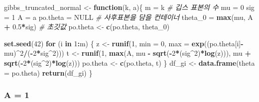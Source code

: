 \documentclass[
]{article}
\newenvironment{Shaded}{\begin{snugshade}}{\end{snugshade}}
\newcommand{\AttributeTok}[1]{\textcolor[rgb]{0.13,0.29,0.53}{#1}}
\newcommand{\CommentTok}[1]{\textcolor[rgb]{0.56,0.35,0.01}{\textit{#1}}}
\newcommand{\ConstantTok}[1]{\textcolor[rgb]{0.56,0.35,0.01}{#1}}
\newcommand{\ControlFlowTok}[1]{\textcolor[rgb]{0.13,0.29,0.53}{\textbf{#1}}}
\newcommand{\DecValTok}[1]{\textcolor[rgb]{0.00,0.00,0.81}{#1}}
\newcommand{\FloatTok}[1]{\textcolor[rgb]{0.00,0.00,0.81}{#1}}
\newcommand{\FunctionTok}[1]{\textcolor[rgb]{0.13,0.29,0.53}{\textbf{#1}}}
\newcommand{\NormalTok}[1]{#1}
\newcommand{\OtherTok}[1]{\textcolor[rgb]{0.56,0.35,0.01}{#1}}
\newcommand{\SpecialCharTok}[1]{\textcolor[rgb]{0.81,0.36,0.00}{\textbf{#1}}}
\begin{document}
\begin{Shaded}
\begin{Highlighting}[]
\NormalTok{gibbs\_truncated\_normal }\OtherTok{\textless{}{-}} \ControlFlowTok{function}\NormalTok{(k, a)\{}
\NormalTok{  m }\OtherTok{=}\NormalTok{ k }\CommentTok{\# 깁스 표본의 수}
\NormalTok{  mu }\OtherTok{=} \DecValTok{0} 
\NormalTok{  sig }\OtherTok{=} \DecValTok{1} 
\NormalTok{  A }\OtherTok{=}\NormalTok{ a }
\NormalTok{  po.theta }\OtherTok{=} \ConstantTok{NULL} \CommentTok{\# 사후표본을 담을 컨테이너}
\NormalTok{  theta\_0 }\OtherTok{=} \FunctionTok{max}\NormalTok{(mu, A }\SpecialCharTok{+} \FloatTok{0.5}\SpecialCharTok{*}\NormalTok{sig) }\CommentTok{\# 초깃값}
\NormalTok{  po.theta }\OtherTok{\textless{}{-}} \FunctionTok{c}\NormalTok{(po.theta, theta\_0)}

  \FunctionTok{set.seed}\NormalTok{(}\DecValTok{42}\NormalTok{)}
  \ControlFlowTok{for}\NormalTok{ (i }\ControlFlowTok{in} \DecValTok{1}\SpecialCharTok{:}\NormalTok{m) \{}
\NormalTok{    z }\OtherTok{\textless{}{-}} \FunctionTok{runif}\NormalTok{(}\DecValTok{1}\NormalTok{, }\AttributeTok{min =} \DecValTok{0}\NormalTok{, }\AttributeTok{max =} \FunctionTok{exp}\NormalTok{((po.theta[i]}\SpecialCharTok{{-}}\NormalTok{mu)}\SpecialCharTok{\^{}}\DecValTok{2}\SpecialCharTok{/}\NormalTok{(}\SpecialCharTok{{-}}\DecValTok{2}\SpecialCharTok{*}\NormalTok{sig}\SpecialCharTok{\^{}}\DecValTok{2}\NormalTok{)))}
\NormalTok{    t }\OtherTok{\textless{}{-}} \FunctionTok{runif}\NormalTok{(}\DecValTok{1}\NormalTok{, }\FunctionTok{max}\NormalTok{(A, mu }\SpecialCharTok{{-}} \FunctionTok{sqrt}\NormalTok{(}\SpecialCharTok{{-}}\DecValTok{2}\SpecialCharTok{*}\NormalTok{(sig}\SpecialCharTok{\^{}}\DecValTok{2}\NormalTok{)}\SpecialCharTok{*}\FunctionTok{log}\NormalTok{(z))), mu }\SpecialCharTok{+} \FunctionTok{sqrt}\NormalTok{(}\SpecialCharTok{{-}}\DecValTok{2}\SpecialCharTok{*}\NormalTok{(sig}\SpecialCharTok{\^{}}\DecValTok{2}\NormalTok{)}\SpecialCharTok{*}\FunctionTok{log}\NormalTok{(z)))}
\NormalTok{    po.theta }\OtherTok{\textless{}{-}} \FunctionTok{c}\NormalTok{(po.theta, t)}
\NormalTok{  \}}
\NormalTok{  df\_gi }\OtherTok{\textless{}{-}} \FunctionTok{data.frame}\NormalTok{(}\AttributeTok{theta =}\NormalTok{ po.theta)}
  \FunctionTok{return}\NormalTok{(df\_gi)}
\NormalTok{\}}
\end{Highlighting}
\end{Shaded}

\subsubsection{A = 1}\label{a-1-1}
\end{document}

